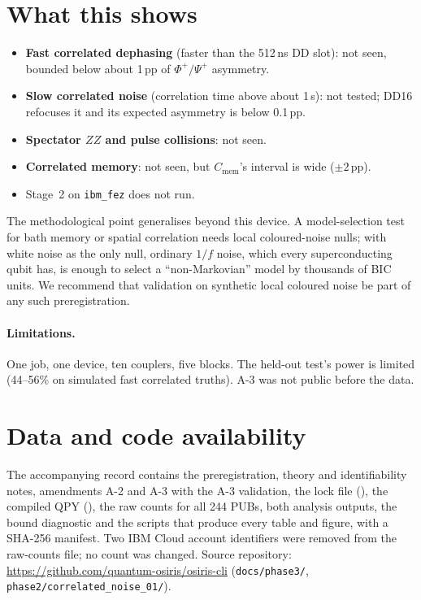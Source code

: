 \documentclass[10pt,twocolumn]{article}
\begin{document}
\section{What this shows}
\begin{itemize}\itemsep0pt
\item \textbf{Fast correlated dephasing} (faster than the 512\,ns DD slot): not seen, bounded below
about 1\,pp of $\Phi^+/\Psi^+$ asymmetry.
\item \textbf{Slow correlated noise} (correlation time above about 1\,\textmu s): not tested; DD16
refocuses it and its expected asymmetry is below 0.1\,pp.
\item \textbf{Spectator $ZZ$ and pulse collisions}: not seen.
\item \textbf{Correlated memory}: not seen, but $C_{\mathrm{mem}}$'s interval is wide ($\pm2$\,pp).
\item Stage~2 on \texttt{ibm\_fez} does not run.
\end{itemize}

The methodological point generalises beyond this device. A model-selection test for bath memory or
spatial correlation needs local coloured-noise nulls; with white noise as the only null, ordinary
$1/f$ noise, which every superconducting qubit has, is enough to select a ``non-Markovian'' model by
thousands of BIC units. We recommend that validation on synthetic local coloured noise be part of any
such preregistration.

\paragraph{Limitations.} One job, one device, ten couplers, five blocks. The held-out test's power is
limited (44--56\% on simulated fast correlated truths). A-3 was not public before the data.

\section*{Data and code availability}
The accompanying record contains the preregistration, theory and identifiability notes, amendments
A-2 and A-3 with the A-3 validation, the lock file (\texttt{}), the compiled QPY
(\texttt{}), the raw counts for all 244 PUBs, both analysis outputs, the bound
diagnostic and the scripts that produce every table and figure, with a SHA-256 manifest. Two IBM Cloud
account identifiers were removed from the raw-counts file; no count was changed. Source repository:
\url{https://github.com/quantum-osiris/osiris-cli} (\texttt{docs/phase3/}, \texttt{phase2/correlated\_noise\_01/}).
\end{document}
